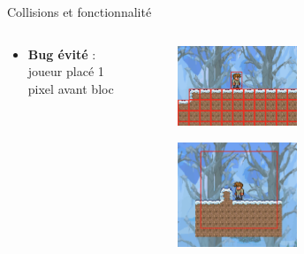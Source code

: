 \documentclass[aspectratio=169]{beamer}
\begin{document}
\begin{frame}{Collisions et fonctionnalité}
\begin{columns}
\begin{column}{0.5\textwidth}
\begin{itemize}
                \item \textbf{Bug évité} : joueur placé 1 pixel avant bloc\\
            \end{itemize}
        \end{column}
        \begin{column}{0.5\textwidth}
            \centering
            \begin{figure}
                \centering
                \captionsetup{format=sanslabel}
                \includegraphics[width=0.5\textwidth]{assets/hit_box.png}
            \end{figure}
            \begin{figure}
                \centering
                \captionsetup{format=sanslabel}
                \includegraphics[width=0.5\textwidth]{assets/camera.png}
            \end{figure}
        \end{column}
    \end{columns}
\end{frame}
\end{document}

